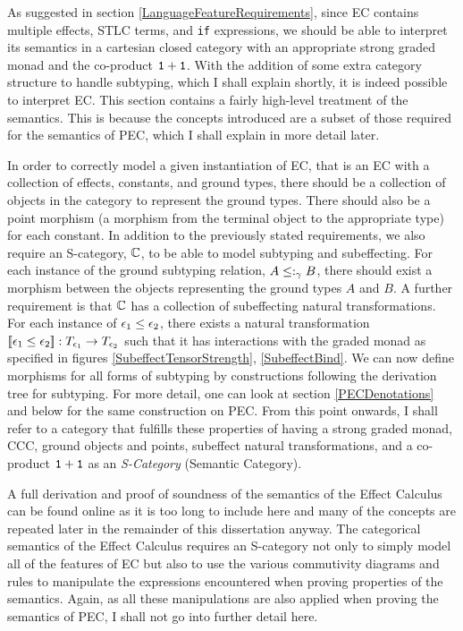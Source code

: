 \documentclass{Report}
\begin{document}
As suggested in section \ref{LanguageFeatureRequirements}, since EC contains multiple effects, STLC terms, and \texttt{if} expressions, we should be able to interpret its semantics in a cartesian closed category with an appropriate strong graded monad and the co-product $\texttt{1} + \texttt{1}$. With the addition of some extra category structure to handle subtyping, which I shall explain shortly, it is indeed possible to interpret EC. This section contains a fairly high-level treatment of the semantics. This is because the concepts introduced are a subset of those required for the semantics of PEC, which I shall explain in more detail later.



\begin{framed}
    \begin{definition}[S-Category]
        In order to correctly model a given instantiation of EC, that is an EC with a collection of effects, constants, and ground types, there should be a collection of objects in the category to represent the ground types. There should also be a point morphism (a morphism from the terminal object to the appropriate type) for each constant. In addition to the previously stated requirements, we also require an S-category, $\mathbb{C}$, to be able to model subtyping and subeffecting. For each instance of the ground subtyping relation, $A \leq:_\gamma B$, there should exist a morphism between the objects representing the ground types $A$ and $B$. A further requirement is that $\mathbb{C}$ has a collection of subeffecting natural transformations. For each instance of $\epsilon_1 \leq \epsilon_2$, there exists a natural transformation ${\bf [\![}\epsilon_1\leq\epsilon_2{\bf ]\!]}: T_{\epsilon_1}{}\rightarrow T_{\epsilon_2}{}$ such that it has interactions with the graded monad as specified in figures \ref{SubeffectTensorStrength}, \ref{SubeffectBind}. We can now define morphisms for all forms of subtyping by constructions following the derivation tree for subtyping. For more detail, one can look at section \ref{PECDenotations} and below for the same construction on PEC. From this point onwards, I shall refer to a category that fulfills these properties of having a strong graded monad, CCC, ground objects and points, subeffect natural transformations, and a co-product $\texttt{1} + \texttt{1}$ as an \textit{S-Category} (Semantic Category).
    \end{definition}
\end{framed}

A full derivation and proof of soundness of the semantics of the Effect Calculus can be found online  as it is too long to include here and many of the concepts are repeated later in the remainder of this dissertation anyway. The categorical semantics of the Effect Calculus requires an S-category not only to simply model all of the features of EC but also to use the various commutivity diagrams and rules to manipulate the expressions encountered when proving properties of the semantics. Again, as all these manipulations are also applied when proving the semantics of PEC, I shall not go into further detail here.
\end{document}
